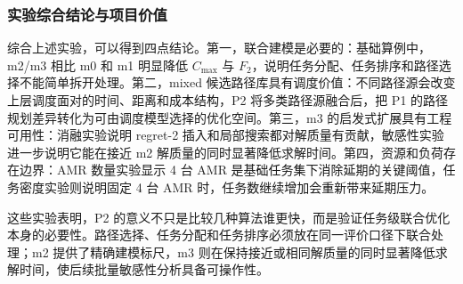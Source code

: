 \subsubsection{实验综合结论与项目价值}

综合上述实验，可以得到四点结论。第一，联合建模是必要的：基础算例中，m2/m3 相比 m0 和 m1 明显降低 $C_{\max}$ 与 $F_2$，说明任务分配、任务排序和路径选择不能简单拆开处理。第二，mixed 候选路径库具有调度价值：不同路径源会改变上层调度面对的时间、距离和成本结构，P2 将多类路径源融合后，把 P1 的路径规划差异转化为可由调度模型选择的优化空间。第三，m3 的启发式扩展具有工程可用性：消融实验说明 regret-2 插入和局部搜索都对解质量有贡献，敏感性实验进一步说明它能在接近 m2 解质量的同时显著降低求解时间。第四，资源和负荷存在边界：AMR 数量实验显示 4 台 AMR 是基础任务集下消除延期的关键阈值，任务密度实验则说明固定 4 台 AMR 时，任务数继续增加会重新带来延期压力。

这些实验表明，P2 的意义不只是比较几种算法谁更快，而是验证任务级联合优化本身的必要性。路径选择、任务分配和任务排序必须放在同一评价口径下联合处理；m2 提供了精确建模标尺，m3 则在保持接近或相同解质量的同时显著降低求解时间，使后续批量敏感性分析具备可操作性。


